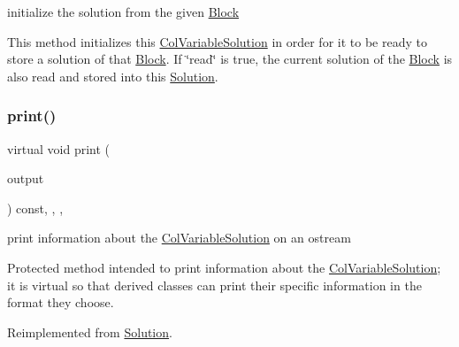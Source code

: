initialize the solution from the given \mbox{\hyperlink{class_s_m_spp__di__unipi__it_1_1_block}{Block}} 

This method initializes this \mbox{\hyperlink{class_s_m_spp__di__unipi__it_1_1_col_variable_solution}{Col\+Variable\+Solution}} in order for it to be ready to store a solution of that \mbox{\hyperlink{class_s_m_spp__di__unipi__it_1_1_block}{Block}}. If \char`\"{}read\char`\"{} is true, the current solution of the \mbox{\hyperlink{class_s_m_spp__di__unipi__it_1_1_block}{Block}} is also read and stored into this \mbox{\hyperlink{class_s_m_spp__di__unipi__it_1_1_solution}{Solution}}. \mbox{\label{class_s_m_spp__di__unipi__it_1_1_col_variable_solution_a59a9fcbf8f9f86d348344b2073644b0e}} 
\subsubsection{\texorpdfstring{print()}{print()}}
{\footnotesize\ttfamily virtual void print (\begin{DoxyParamCaption}\item[{std\+::ostream \&}]{output }\end{DoxyParamCaption}) const\hspace{0.3cm}{\ttfamily [inline]}, {\ttfamily [override]}, {\ttfamily [protected]}, {\ttfamily [virtual]}}



print information about the \mbox{\hyperlink{class_s_m_spp__di__unipi__it_1_1_col_variable_solution}{Col\+Variable\+Solution}} on an ostream 

Protected method intended to print information about the \mbox{\hyperlink{class_s_m_spp__di__unipi__it_1_1_col_variable_solution}{Col\+Variable\+Solution}}; it is virtual so that derived classes can print their specific information in the format they choose. 

Reimplemented from \mbox{\hyperlink{class_s_m_spp__di__unipi__it_1_1_solution_a2e7b9c9148a98c5c342e8c25cac95926}{Solution}}.

\mbox{\label{class_s_m_spp__di__unipi__it_1_1_col_variable_solution_a13487898d41f593b3cc0ae6a69feb3ff}} 
